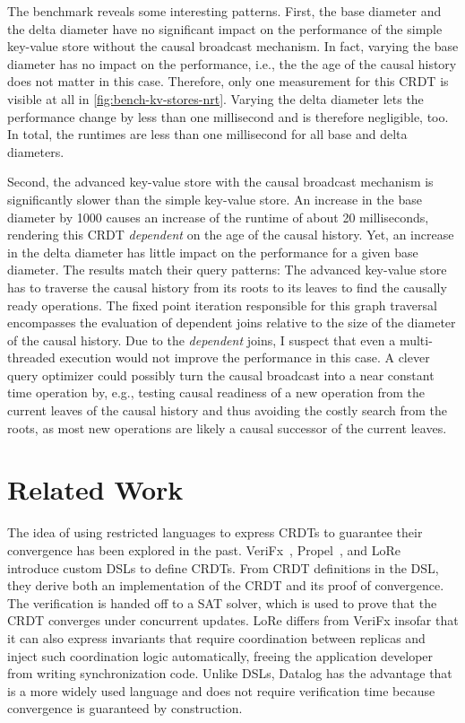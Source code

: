 The benchmark reveals some interesting patterns.
First, the base diameter and the delta diameter have no significant impact
on the performance of the simple key-value store without the causal broadcast
mechanism.
In fact, varying the base diameter has no impact on the performance, i.e.,
the the age of the causal history does not matter in this case.
Therefore, only one measurement for this \ac{CRDT} is visible at all
in \ref{fig:bench-kv-stores-nrt}.
Varying the delta diameter lets the performance change by less than one millisecond
and is therefore negligible, too.
In total, the runtimes are less than one millisecond for all base and delta diameters.

Second, the advanced key-value store with the causal broadcast mechanism
is significantly slower than the simple key-value store.
An increase in the base diameter by 1000 causes an increase of the runtime of
about 20 milliseconds, rendering this \ac{CRDT} \emph{dependent} on the age
of the causal history.
Yet, an increase in the delta diameter has little impact on the performance
for a given base diameter.
The results match their query patterns:
The advanced key-value store has to traverse the causal history from its
roots to its leaves to find the causally ready operations.
The fixed point iteration responsible for this graph traversal encompasses the
evaluation of dependent joins relative to the size of the diameter of the causal
history.
Due to the \emph{dependent} joins, I suspect that even a multi-threaded execution
would not improve the performance in this case.
A clever query optimizer could possibly turn the causal broadcast into
a near constant time operation by, e.g., testing causal readiness of a new operation
from the current leaves of the causal history and thus avoiding the
costly search from the roots, as most new operations are likely a causal successor
of the current leaves.



\section{Related Work}\label{sec:related-work}

The idea of using restricted languages to express \acp{CRDT} to guarantee
their convergence has been explored in the past.
VeriFx~\cite{verifx}, Propel~\cite{propel}, and LoRe~\cite{lore} introduce
custom \acp{DSL} to define \acp{CRDT}.
From \ac{CRDT} definitions in the \ac{DSL}, they derive both an implementation
of the \ac{CRDT} and its proof of convergence.
The verification is handed off to a \acs{SAT} solver, which is used to
prove that the \ac{CRDT} converges under concurrent updates.
LoRe differs from VeriFx insofar that it can also express invariants that
require coordination between replicas and inject such coordination logic
automatically, freeing the application developer from writing synchronization
code.
Unlike \acp{DSL}, Datalog has the advantage that is a more widely used language
and does not require verification time because convergence is guaranteed by
construction.


